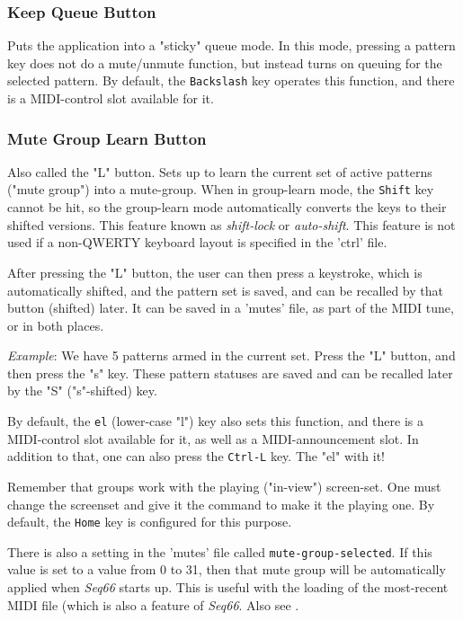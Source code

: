 \subsubsection{Keep Queue Button}
\label{subsubsec:introduction_keep_queue_button}

   Puts the application into a "sticky" queue mode.
   In this mode, pressing a pattern key does not do a mute/unmute function, but
   instead turns on queuing for the selected pattern.
   By default, the \texttt{Backslash} key operates this function,
   and there is a MIDI-control slot available for it.

\subsubsection{Mute Group Learn Button}
\label{subsubsec:introduction_mute_group_learn_button}

   Also called the "L" button.
   Sets up to learn the current set of active patterns ("mute group") into a
   mute-group.
   When in group-learn mode, the \texttt{Shift} key cannot be hit, so the
   group-learn mode automatically converts the keys to their shifted versions.
   This feature known as \textsl{shift-lock} or \textsl{auto-shift}.
   This feature is not used if a non-QWERTY keyboard layout is
   specified in the 'ctrl' file.

   After pressing the "L" button, the user can then press a keystroke, which is
   automatically shifted, and the pattern set is saved, and can be recalled by
   that button (shifted) later.  It can be saved in a 'mutes' file, as part of
   the MIDI tune, or in both places.

   \textsl{Example}:
   We have 5 patterns armed in the current set. Press the "L" button,
   and then press the "s" key.  These pattern statuses are saved and can be
   recalled later by the "S" ("s"-shifted) key.

   By default, the \texttt{el} (lower-case "l") key also sets this function,
   and there is a MIDI-control slot available for it, as well as a
   MIDI-announcement slot.
   In addition to that, one can also press
   the \texttt{Ctrl-L} key.
   The "el" with it!

   Remember that groups work with the playing ("in-view") screen-set.
   One must change the screenset and give it the command to make it the
   playing one.
   By default, the \texttt{Home} key is configured for this purpose.

   There is also a setting in the 'mutes' file called
   \texttt{mute-group-selected}.  If this value is set to a value from 0 to 31,
   then that mute group will be automatically applied when
   \textsl{Seq66} starts up.
   This is useful with the loading of the most-recent MIDI file (which is also
   a feature of \textsl{Seq66}.
   Also see .


